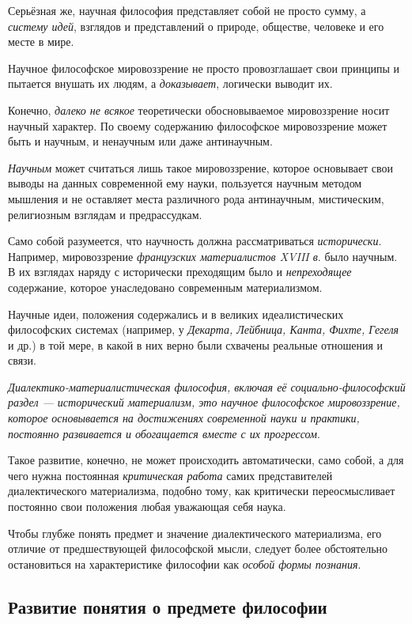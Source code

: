 \documentclass[a4paper,14pt,russian]{extreport}
\begin{document}
Серьёзная же, научная философия представляет собой не просто сумму, а \emph{систему идей}, взглядов и представлений о природе, обществе, человеке и его месте в мире.

Научное философское мировоззрение не просто провозглашает свои принципы и пытается внушать их людям, а \emph{доказывает}, логически выводит их.

Конечно, \emph{далеко не всякое} теоретически обосновываемое мировоззрение носит научный характер. По своему содержанию философское мировоззрение может быть и научным, и ненаучным или даже антинаучным.

\emph{Научным} может считаться лишь такое мировоззрение, которое основывает свои выводы на данных современной ему науки, пользуется научным методом мышления и не оставляет места различного рода антинаучным, мистическим, религиозным взглядам и предрассудкам.

Само собой разумеется, что научность должна рассматриваться \emph{исторически}. Например, мировоззрение \emph{французских материалистов XVIII в}. было научным. В их взглядах наряду с исторически преходящим было и \emph{непреходящее} содержание, которое унаследовано современным материализмом.

Научные идеи, положения содержались и в великих идеалистических философских системах (например, у \emph{Декарта, Лейбница, Канта, Фихте, Гегеля} и др.) в той мере, в какой в них верно были схвачены реальные отношения и связи.

\emph{Диалектико-материалистическая философия, включая её социально-философский раздел --- исторический материализм, это научное философское мировоззрение, которое основывается на достижениях современной науки и практики, постоянно развивается и обогащается вместе с их прогрессом}.

Такое развитие, конечно, не может происходить автоматически, само собой, а для чего нужна постоянная \emph{критическая работа} самих представителей диалектического материализма, подобно тому, как критически переосмысливает постоянно свои положения любая уважающая себя наука.

Чтобы глубже понять предмет и значение диалектического материализма, его отличие от предшествующей философской мысли, следует более обстоятельно остановиться на характеристике философии как \emph{особой формы познания}.

\subsection{Развитие понятия о предмете философии}
\end{document}
